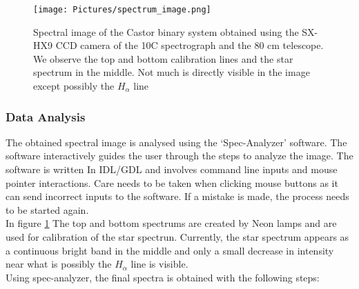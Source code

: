 \documentclass[12pt,a4paper]{article}
\begin{document}
      \begin{figure}[H]
        \centering
        \texttt{[image: Pictures/spectrum\_image.png]}
        \caption{Spectral image of the Castor binary system obtained using the SX-HX9 CCD camera of the 10C spectrograph and the 80 cm telescope. 
        We observe the top and bottom calibration lines and the star spectrum in the middle. Not much is directly visible in the image except possibly the $H_\alpha$ line}
        \label{spectrum_img} 
      \end{figure}
    \subsubsection{Data Analysis}
      The obtained spectral image is analysed using the `Spec-Analyzer' software. The software interactively guides the user through the steps to analyze the image. The software is written In
      IDL/GDL and involves command line inputs and mouse pointer interactions. Care needs to be taken when clicking mouse buttons as it can send incorrect inputs to the software. If a mistake is made, the process
      needs to be started again. \\
      In figure \ref{spectrum_img} The top and bottom spectrums are created by Neon lamps and are used for calibration of  the star spectrun. Currently, the star spectrum appears as a
      continuous bright band in the middle and only a small decrease in intensity near what is possibly the $H_\alpha$ line is visible. \\
      Using spec-analyzer, the final spectra is obtained with the following steps:
\end{document}

